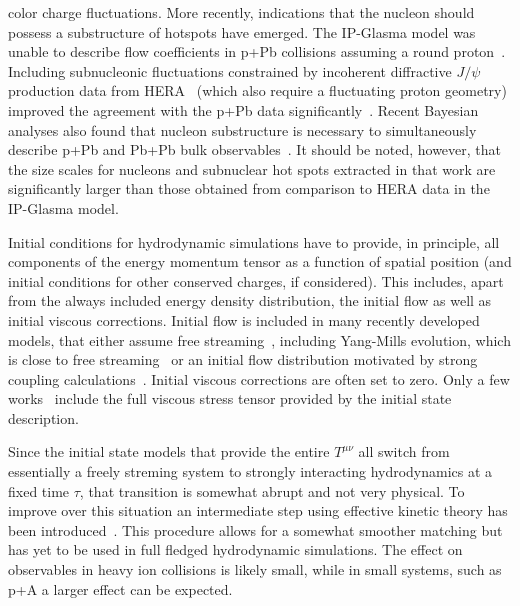 	color charge fluctuations.
More recently, indications that the nucleon should possess a substructure of hotspots 
  have emerged. 
The IP-Glasma model was unable to describe flow coefficients in p+Pb 
  collisions assuming a round proton~\cite{Schenke:2014zha}. 
Including subnucleonic fluctuations constrained by incoherent 
  diffractive $J/\psi$ production data from HERA~\cite{Mantysaari:2016ykx} 
	(which also require a fluctuating proton geometry) improved the agreement 
	with the p+Pb data significantly~\cite{Mantysaari:2017cni}. 
Recent Bayesian analyses also found that nucleon substructure is necessary 
  to simultaneously describe p+Pb and Pb+Pb bulk observables~\cite{Moreland:2018gsh}.
It should be noted, however, that the size scales for nucleons and subnuclear 
  hot spots extracted in that work are significantly larger than those obtained
	from comparison to HERA data in the IP-Glasma model.

Initial conditions for hydrodynamic simulations have to provide, in principle, 
  all components of the energy momentum tensor as a function of spatial position 
	(and initial conditions for other conserved charges, if considered). 
This includes, apart from the always included energy density distribution, 
  the initial flow as well as initial viscous corrections. 
Initial flow is included in many recently developed models, that either assume 
  free streaming~\cite{Moreland:2018gsh}, including Yang-Mills evolution, which 
	is close to free streaming~\cite{Gale:2012rq} or an initial flow distribution 
	motivated by strong coupling calculations~\cite{Weller:2017tsr}. 
Initial viscous corrections are often set to zero. 
Only a few works~\cite{Mantysaari:2017cni,Schenke:2018fci,Moreland:2018gsh} 
  include the full viscous stress tensor provided by the initial state description.

Since the initial state models that provide the entire $T^{\mu\nu}$ all switch 
  from essentially a freely streming system to strongly interacting hydrodynamics 
	at a fixed time $\tau$, that transition is somewhat abrupt and not very physical. 
To improve over this situation an intermediate step using effective kinetic theory 
  has been introduced~\cite{Kurkela:2018wud,Kurkela:2018vqr}. 
This procedure allows for a somewhat smoother matching but has yet to be used in 
  full fledged hydrodynamic simulations. 
The effect on observables in heavy ion collisions is likely small, while in small 
  systems, such as p+A a larger effect can be expected.

